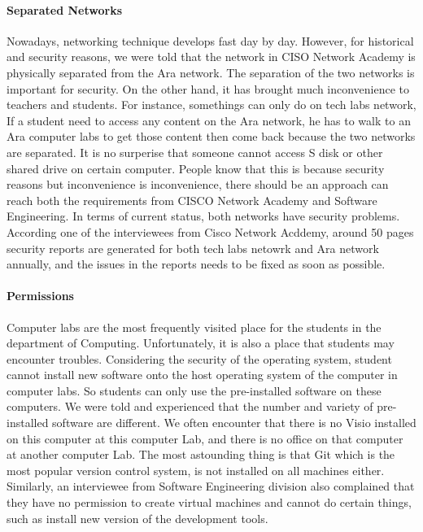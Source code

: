 \paragraph{Separated Networks}
Nowadays, networking technique develops fast day by day. However, for historical and security reasons, we were told that the network in CISO Network Academy is physically separated from the Ara network. The separation of the two networks is important for security. On the other hand, it has brought much inconvenience to teachers and students. For instance, somethings can only do on tech labs network, If a student need to access any content on the Ara network, he has to walk to an Ara computer labs to get those content then come back because the two networks are separated. It is no surperise that someone cannot access S disk or other shared drive on certain computer. People know that this is because security reasons but inconvenience is inconvenience, there should be an approach can reach both the requirements from CISCO Network Academy and Software Engineering. In terms of current status, both networks have security problems. According one of the interviewees from Cisco Network Acddemy, around 50 pages security reports are generated for both tech labs netowrk and Ara network annually, and the issues in the reports needs to be fixed as soon as possible.

\paragraph{Permissions}
Computer labs are the most frequently visited place for the students in the department of Computing. Unfortunately, it is also a place that students may encounter troubles. Considering the security of the operating system, student cannot install new software onto the host operating system of the computer in computer labs. So students can only use the pre-installed software on these computers. We were told and experienced that the number and variety of pre-installed software are different. We often encounter that there is no Visio installed on this computer at this computer Lab, and there is no office on that computer at another computer Lab. The most astounding thing is that Git which is the most popular version control system, is not installed on all machines either. Similarly, an interviewee from Software Engineering division also complained that they have no permission to create virtual machines and cannot do certain things, such as install new version of the development tools.

